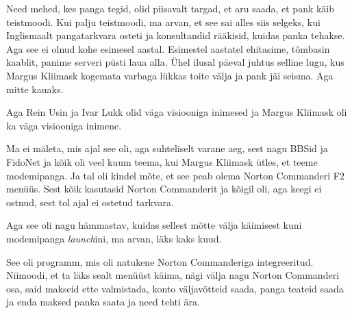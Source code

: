 
Need mehed, kes panga tegid, olid piisavalt targad, et aru saada, et pank käib 
teistmoodi. Kui palju teistmoodi, ma arvan, et see sai alles siis selgeks, kui 
Inglismaalt pangatarkvara osteti ja konsultandid rääkisid, kuidas panka 
tehakse. Aga see ei olnud kohe esimesel aastal. Esimestel aastatel ehitasime, 
tõmbasin kaablit, panime serveri püsti laua alla. Ühel ilusal päeval juhtus 
selline lugu, kus Margus Kliimask kogemata varbaga 
lükkas toite välja ja pank jäi seisma. Aga mitte kauaks. 

Aga Rein Usin ja Ivar Lukk olid 
väga visiooniga inimesed ja Margus Kliimask oli ka 
väga visiooniga inimene. 

Ma ei mäleta, mis ajal see oli, aga suhteliselt varane aeg, sest nagu BBSid ja 
FidoNet ja kõik oli veel kuum teema, kui Margus Kliimask ütles, et teeme 
modemipanga. Ja tal oli kindel mõte, et see peab olema Norton 
Commanderi F2 menüüs. Sest kõik kasutasid Norton Commanderit 
ja kõigil oli, aga keegi ei ostnud, sest tol ajal ei ostetud tarkvara. 


Aga see oli nagu hämmastav, kuidas sellest mõtte välja käimisest kuni 
modemipanga \emph{launch}ini, ma arvan, läks kaks kuud.


See  oli programm, mis oli natukene Norton Commanderiga integreeritud. 
Niimoodi, et ta läks sealt menüüst käima, nägi välja nagu Norton Commanderi 
osa, said makseid ette valmistada, konto väljavõtteid saada, panga teateid 
saada ja enda maksed panka saata ja need tehti ära.

